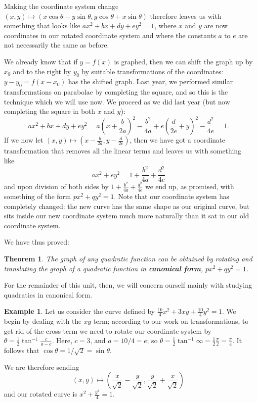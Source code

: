 \documentclass[a4paper,leqno]{article}
\numberwithin{equation}{section}
\newtheorem{thm}[equation]{Theorem}
\theoremstyle{definition}
\newtheorem{ex}[equation]{Example}
\theoremstyle{remark}
\newcommand{\df}[1]{\textbf{#1}}
\begin{document}
Making the coordinate system change $ (x,y) \mapsto (x \cos \theta - y \sin \theta,y \cos \theta + x \sin \theta) $ therefore leaves
us with something that looks like $ ax^2 + bx + dy + ey^2 = 1 $, where $ x $ and $ y $ are now coordinates in our rotated coordinate
system and where the constants $ a $ to $ e $ are not necessarily the same as before.

We already know that if $ y = f(x) $ is graphed, then we can shift the graph up by $ x_0 $ and to the right
by $ y_0 $ by suitable transformations of the coordinates: $ y - y_0 = f(x - x_0) $ has the shifted graph. Last
year, we performed similar transformations on parabolae by completing the square, and so this is the technique
which we will use now. We proceed as we did last year (but now completing the square in both $ x $ and $ y $):
\begin{displaymath}
  ax^2 + bx + dy + ey^2 = a\left(x + \frac{b}{2a}\right)^2 - \frac{b^2}{4a} + e\left(\frac{d}{2e} + y\right)^2 - \frac{d^2}{4e} = 1.
\end{displaymath}
If we now let $ (x, y) \mapsto \left(x - \frac{b}{2a}, y - \frac{d}{2e}\right) $, then we have got a coordinate
transformation that removes all the linear terms and leaves us with something like
\begin{displaymath}
  ax^2 + ey^2 = 1 + \frac{b^2}{4a} + \frac{d^2}{4e}
\end{displaymath}
and upon division of both sides by $ 1 + \frac{b^2}{4a} + \frac{d^2}{4e} $ we end up, as promised, with something of
the form $ px^2 + qy^2 = 1 $. Note that our coordinate system has completely changed: the new curve has the same
shape as our original curve, but sits inside our new coordinate system much more naturally than it sat in our old
coordinate system.

We have thus proved:
\begin{thm}
  The graph of any quadratic function can be obtained by rotating and translating the graph of
  a quadratic function in \df{canonical form}, $ px^2 + qy^2 = 1 $.
\end{thm}

For the remainder of this unit, then, we will concern ourself mainly with studying quadratics in canonical form.

\begin{ex}
  Let us consider the curve defined by $ \frac{10}{4}x^2 + 3xy + \frac{10}{4}y^2 = 1 $. We begin by dealing with the $ xy $ term; according to
  our work on transformations, to get rid of the cross-term we need to rotate our coordinate system
  by $ \theta = \frac{1}{2}\tan^{-1} \frac{c}{a - e} $. Here, $ c = 3 $, and $ a = 10/4 = e $;
  so $ \theta = \frac{1}{2} \tan^{-1} \infty = \frac{1}{2} \frac{\pi}{2} = \frac{\pi}{4} $. It follows that $ \cos \theta = 1/\sqrt{2} = \sin\theta $.

  We are therefore sending
  \begin{equation}
    (x,y) \mapsto \left(\frac{x}{\sqrt{2}} - \frac{y}{\sqrt{2}}, \frac{y}{\sqrt{2}} + \frac{x}{\sqrt{2}}\right)
  \end{equation}
  and our rotated curve is $ x^2 + \frac{y^2}{4} = 1$.
\end{ex}
\end{document}

